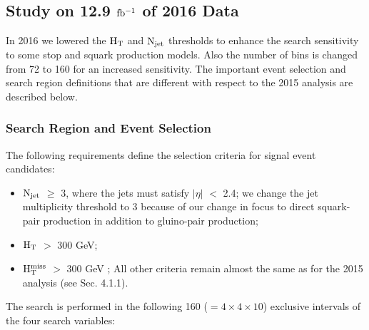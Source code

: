 \newpage
\subsection{Study on 12.9 $\rm fb^{-1}$ of 2016 Data}
In 2016 we lowered the $\rm H_{T}$ and $\rm N_{jet}$ thresholds to enhance the search sensitivity to some stop and squark production models. Also the number of bins is changed from 72 to 160 for an increased sensitivity. The important event selection and search region definitions that are different with respect to the 2015 analysis are described below. 
\subsubsection{Search Region and Event Selection}

The following requirements define the selection criteria for signal event candidates:
\begin{itemize}
\item $\rm N_{jet}$ $\geq$ 3, where the jets must satisfy $|\eta|$ $<$ 2.4; we change the jet multiplicity threshold to 3 because of our change in focus to direct squark-pair production in addition to gluino-pair production;
\item $\rm H_{T}$  $>$ 300 GeV;
\item $\rm H_{T}^{miss}$ $>$  300 GeV ;
All other criteria remain almost the same as for the 2015 analysis (see Sec. 4.1.1).

\end{itemize}
The search is performed in the following 160 ($=4\times4\times10$) exclusive intervals of the four search variables:
